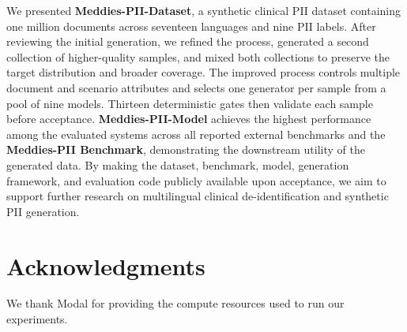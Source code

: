 \documentclass[11pt]{article}
\begin{document}
We presented \textbf{Meddies-PII-Dataset}, a synthetic clinical PII dataset containing one million documents across seventeen languages and nine PII labels. After reviewing the initial generation, we refined the process, generated a second collection of higher-quality samples, and mixed both collections to preserve the target distribution and broader coverage. The improved process controls multiple document and scenario attributes and selects one generator per sample from a pool of nine models. Thirteen deterministic gates then validate each sample before acceptance. \textbf{Meddies-PII-Model} achieves the highest performance among the evaluated systems across all reported external benchmarks and the \textbf{Meddies-PII Benchmark}, demonstrating the downstream utility of the generated data. By making the dataset, benchmark, model, generation framework, and evaluation code publicly available upon acceptance, we aim to support further research on multilingual clinical de-identification and synthetic PII generation.

\section*{Acknowledgments}

We thank Modal for providing the compute resources used to run our experiments.


\end{document}
